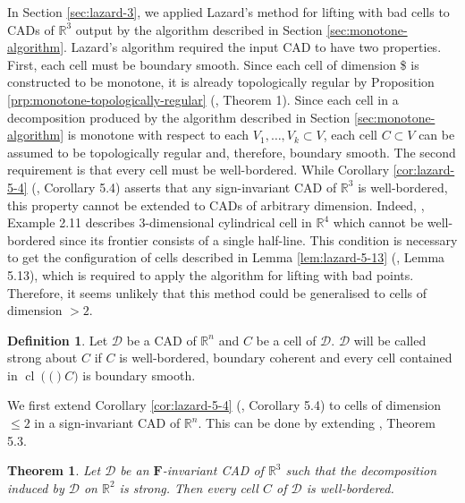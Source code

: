 \documentclass[
]{book}
\newtheorem{theorem}{Theorem}[chapter]
\theoremstyle{definition}
\newtheorem{definition}{Definition}[chapter]
\theoremstyle{definition}
\theoremstyle{definition}
\theoremstyle{definition}
\theoremstyle{remark}
\begin{document}
In Section \ref{sec:lazard-3}, we applied Lazard's method for lifting with bad cells to CADs of \(\mathbb{R}^3\) output by the algorithm described in Section \ref{sec:monotone-algorithm}. Lazard's algorithm required the input CAD to have two properties. First, each cell must be boundary smooth. Since each cell of dimension \$ is constructed to be monotone, it is already topologically regular by Proposition \ref{prp:monotone-topologically-regular} (\citet{bgv13}, Theorem 1). Since each cell in a decomposition produced by the algorithm described in Section \ref{sec:monotone-algorithm} is monotone with respect to each \(V_1,\ldots,V_k \subset V\), each cell \(C \subset V\) can be assumed to be topologically regular and, therefore, boundary smooth. The second requirement is that every cell must be well-bordered. While Corollary \ref{cor:lazard-5-4} (\citet{lazard10}, Corollary 5.4) asserts that any sign-invariant CAD of \(\mathbb{R}^3\) is well-bordered, this property cannot be extended to CADs of arbitrary dimension. Indeed, \citet{lazard10}, Example 2.11 describes \(3\)-dimensional cylindrical cell in \(\mathbb{R}^4\) which cannot be well-bordered since its frontier consists of a single half-line. This condition is necessary to get the configuration of cells described in Lemma \ref{lem:lazard-5-13} (\citet{lazard10}, Lemma 5.13), which is required to apply the algorithm for lifting with bad points. Therefore, it seems unlikely that this method could be generalised to cells of dimension \(> 2\).

\begin{definition}
\protect\hypertarget{def:strong-about-c}{}\label{def:strong-about-c}Let \(\mathcal{D}\) be a CAD of \(\mathbb{R}^n\) and \(C\) be a cell of \(\mathcal{D}\). \(\mathcal{D}\) will be called strong about \(C\) if \(C\) is well-bordered, boundary coherent and every cell contained in \({\operatorname{cl} \left( ( \right)}C)\) is boundary smooth.
\end{definition}

We first extend Corollary \ref{cor:lazard-5-4} (\citet{lazard10}, Corollary 5.4) to cells of dimension \(\le 2\) in a sign-invariant CAD of \(\mathbb{R}^n\).
This can be done by extending \citet{lazard10}, Theorem 5.3.

\begin{theorem}
\protect\hypertarget{thm:lazard-5-3}{}\label{thm:lazard-5-3}Let \(\mathcal{D}\) be an \(\mathbf{F}\)-invariant CAD of \(\mathbb{R}^3\) such that the decomposition induced by \(\mathcal{D}\) on \(\mathbb{R}^2\) is strong. Then every cell \(C\) of \(\mathcal{D}\) is well-bordered.
\end{theorem}
\end{document}
